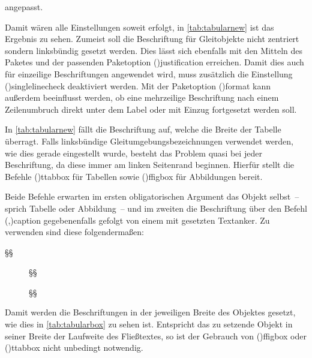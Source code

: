 \documentclass[%
  english,ngerman,%
  cdgeometry=no,DIV=12,%
  cd=false,cdfont=false,cdtitle=true,%
  headings=normal,%
  automark,%
  listof=toc,%
]{tudscrartcl}
\begin{document}
angepasst.
%
\begin{Preamble*}
\end{Preamble*}
%
\begin{table}
\end{table}%
%
Damit wären alle Einstellungen soweit erfolgt, in \autoref{tab:tabularnew} ist 
das Ergebnis zu sehen. Zumeist soll die Beschriftung für Gleitobjekte nicht 
zentriert sondern linksbündig gesetzt werden. Dies lässt sich ebenfalls mit den 
Mitteln des Paketes  und der passenden Paketoption 
\Option(){justification} erreichen. Damit dies auch für 
einzeilige Beschriftungen angewendet wird, muss zusätzlich die Einstellung 
\Option(){singlelinecheck} deaktiviert werden. Mit der 
Paketoption \Option(){format} kann außerdem beeinflusst 
werden, ob eine mehrzeilige Beschriftung nach einem Zeilenumbruch direkt unter 
dem Label oder mit Einzug fortgesetzt werden soll.
%
\begin{Preamble*}
\captionsetup{singlelinecheck=off,format=hang,justification=raggedright}
\end{Preamble*}
%
In \autoref{tab:tabularnew} fällt die Beschriftung auf, welche die Breite der 
Tabelle überragt. Falls linksbündige Gleitumgebungsbezeichnungen verwendet 
werden, wie dies gerade eingestellt wurde, besteht das Problem quasi bei jeder 
Beschriftung, da diese immer am linken Seitenrand beginnen. Hierfür stellt 
 die Befehle \Macro(){ttabbox} für Tabellen 
sowie \Macro(){ffigbox} für Abbildungen bereit. 

Beide Befehle erwarten im ersten obligatorischen Argument das Objekt selbst~-- 
sprich Tabelle oder Abbildung~-- und im zweiten die Beschriftung über den 
Befehl \Macro(,){caption} gegebenenfalls 
gefolgt von einem mit  gesetzten Textanker. Zu verwenden sind 
diese folgendermaßen:
%
\begin{Hint}
\begin{table}
\ttabbox
  §§
  {\caption{§§\label{§\PName{Tabellenlabel}§}}}
\end{table}
\begin{figure}
\ffigbox
  §§
  {\caption{§§\label{§\PName{Abbildungslabel}§}}}
\end{figure}
\end{Hint}
%
Damit werden die Beschriftungen in der jeweiligen Breite des Objektes gesetzt, 
wie dies in \autoref{tab:tabularbox} zu sehen ist. Entspricht das zu setzende 
Objekt in seiner Breite der Laufweite des Fließtextes, so ist der Gebrauch von 
\Macro(){ffigbox} oder \Macro(){ttabbox}
nicht unbedingt notwendig.
\end{document}
